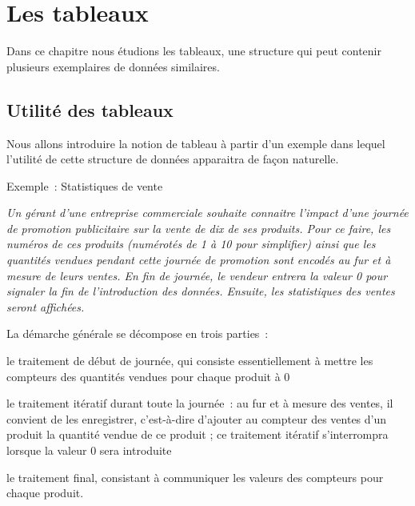 \chapter{Les tableaux}

	Dans ce chapitre nous étudions les tableaux, 
	une structure qui peut contenir 
	plusieurs exemplaires de données similaires.

\section{Utilité des tableaux}

	Nous allons introduire la notion de tableau à partir d’un exemple 
	dans lequel l’utilité de cette structure de données 
	apparaitra de façon naturelle.

	\begin{Emphase}{Exemple~: Statistiques de vente}

		{\itshape
		Un gérant d’une entreprise commerciale souhaite connaitre l’impact d’une
		journée de promotion publicitaire sur la vente de dix de ses produits.
		Pour ce faire, les numéros de ces produits (numérotés de 1 à 10 pour
		simplifier) ainsi que les quantités vendues pendant cette journée de
		promotion sont encodés au fur et à mesure de leurs ventes. En fin de
		journée, le vendeur entrera la valeur 0 pour signaler la fin de
		l’introduction des données. Ensuite, les statistiques des ventes seront
		affichées.}

	\end{Emphase}

	La démarche générale se décompose en trois parties~:

	\begin{liste}
	\item {
		le traitement de début de journée, qui consiste essentiellement à mettre
		les compteurs des quantités vendues pour chaque produit à 0}
		\item {
		le traitement itératif durant toute la journée~: au fur et à mesure des
		ventes, il convient de les enregistrer, c’est-à-dire d’ajouter au
		compteur des ventes d’un produit la quantité vendue de ce produit ; ce
		traitement itératif s’interrompra lorsque la valeur 0 sera introduite}
	\item {
		le traitement final, consistant à communiquer les valeurs des compteurs
		pour chaque produit.}
	\end{liste}

